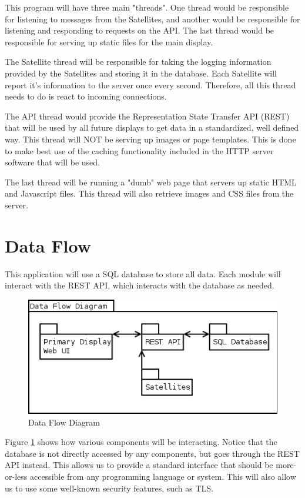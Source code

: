 This program will have three main "threads".
One thread would be responsible for listening to messages from the Satellites, and another would be responsible for listening and responding to requests on the API.
The last thread would be responsible for serving up static files for the main display.

The Satellite thread will be responsible for taking the logging information provided by the Satellites and storing it in the database.
Each Satellite will report it's information to the server once every second.
Therefore, all this thread needs to do is react to incoming connections.

The API thread would provide the Representation State Transfer API (REST) that will be used by all future displays to get data in a standardized, well defined way.
This thread will NOT be serving up images or page templates.
This is done to make best use of the caching functionality included in the HTTP server software that will be used.

The last thread will be running a "dumb" web page that servers up static HTML and Javascript files.
This thread will also retrieve images and CSS files from the server.

\section{Data Flow}

This application will use a SQL database to store all data.
Each module will interact with the REST API, which interacts with the database as needed.

\begin{figure}[H]
\centering
\includegraphics[scale=0.75]{Software/images/DataFlowDiagram.png}
\caption{Data Flow Diagram}
\label{img:S_DataFlowDiagram}
\end{figure}

Figure \ref{img:S_DataFlowDiagram} shows how various components will be interacting.
Notice that the database is not directly accessed by any components, but goes through the REST API instead.
This allows us to provide a standard interface that should be more-or-less accessible from any programming language or system.
This will also allow us to use some well-known security features, such as TLS.

